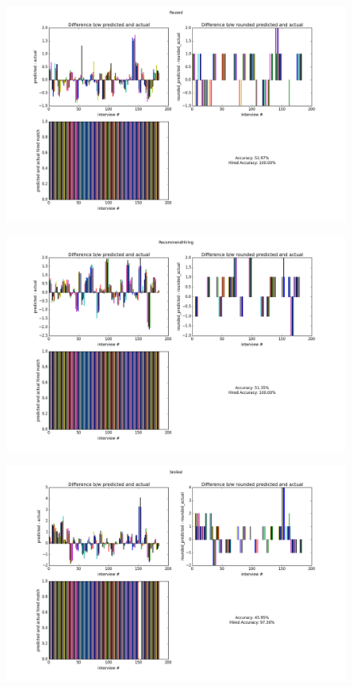 \documentclass[11pt]{article}
\begin{document}
\begin{figure}[H]
\begin{center}
\includegraphics[width=1\columnwidth]{figures2/Paused.png}
\end{center}
\end{figure}

\begin{figure}[H]
\begin{center}
\includegraphics[width=1\columnwidth]{figures2/RecommendHiring.png}
\end{center}
\end{figure}

\begin{figure}[H]
\begin{center}
\includegraphics[width=1\columnwidth]{figures2/Smiled.png}
\end{center}
\end{figure}
\end{document}
